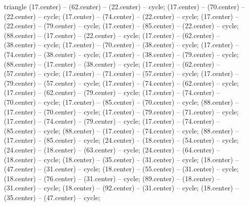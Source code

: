 \begin{pgfonlayer}{triangle}
 (17.center) -- (62.center) -- (22.center) -- cycle; 
 (17.center) -- (70.center) -- (22.center) -- cycle; 
 (17.center) -- (74.center) -- (22.center) -- cycle; 
 (17.center) -- (22.center) -- (79.center) -- cycle; 
 (17.center) -- (85.center) -- (22.center) -- cycle; 
 (88.center) -- (17.center) -- (22.center) -- cycle; 
 (17.center) -- (62.center) -- (38.center) -- cycle; 
 (17.center) -- (70.center) -- (38.center) -- cycle; 
 (17.center) -- (74.center) -- (38.center) -- cycle; 
 (17.center) -- (38.center) -- (79.center) -- cycle; 
 (88.center) -- (17.center) -- (38.center) -- cycle; 
 (17.center) -- (62.center) -- (57.center) -- cycle; 
 (17.center) -- (71.center) -- (57.center) -- cycle; 
 (17.center) -- (79.center) -- (57.center) -- cycle; 
 (17.center) -- (74.center) -- (62.center) -- cycle; 
 (17.center) -- (62.center) -- (79.center) -- cycle; 
 (17.center) -- (74.center) -- (70.center) -- cycle; 
 (17.center) -- (85.center) -- (70.center) -- cycle; 
 (88.center) -- (17.center) -- (70.center) -- cycle; 
 (17.center) -- (79.center) -- (71.center) -- cycle; 
 (17.center) -- (74.center) -- (79.center) -- cycle; 
 (17.center) -- (74.center) -- (85.center) -- cycle; 
 (88.center) -- (17.center) -- (74.center) -- cycle; 
 (88.center) -- (17.center) -- (85.center) -- cycle; 
 (24.center) -- (18.center) -- (54.center) -- cycle; 
 (24.center) -- (18.center) -- (63.center) -- cycle; 
 (24.center) -- (64.center) -- (18.center) -- cycle; 
 (18.center) -- (35.center) -- (31.center) -- cycle; 
 (18.center) -- (47.center) -- (31.center) -- cycle; 
 (18.center) -- (55.center) -- (31.center) -- cycle; 
 (18.center) -- (76.center) -- (31.center) -- cycle; 
 (89.center) -- (18.center) -- (31.center) -- cycle; 
 (18.center) -- (92.center) -- (31.center) -- cycle; 
 (18.center) -- (35.center) -- (47.center) -- cycle; 

\end{pgfonlayer}
